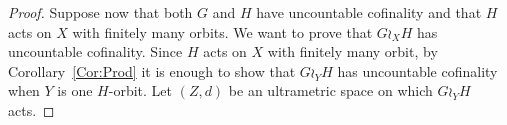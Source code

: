 \documentclass[a4paper]{article}
\theoremstyle{definition}
\theoremstyle{remark}%
\newcommand{\setst}[2]{\{#1\ |\ #2\}}
\begin{document}
\begin{proof}
Suppose now that both $G$ and $H$ have uncountable cofinality and that $H$ acts on $X$ with finitely many orbits. We want to prove that $G\wr_XH$ has uncountable cofinality.
Since $H$ acts on $X$ with finitely many orbit, by Corollary~\ref{Cor:Prod} it is enough to show that $G\wr_YH$ has uncountable cofinality when $Y$ is one $H$-orbit.
%
%
%
%
Let $(Z,d)$ be an ultrametric space on which $G\wr_YH$ acts.

\end{proof}
\end{document}
